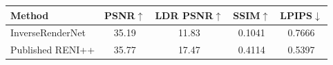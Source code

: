 \begin{tabular}{l|cccc}
\hline
Method & PSNR$\uparrow$ & LDR PSNR$\uparrow$ & SSIM$\uparrow$ & LPIPS$\downarrow$ \\
\hline
InverseRenderNet & 35.19 & 11.83 & 0.1041 & 0.7666 \\
Published RENI++ & 35.77 & 17.47 & 0.4114 & 0.5397 \\
\hline
\end{tabular}
